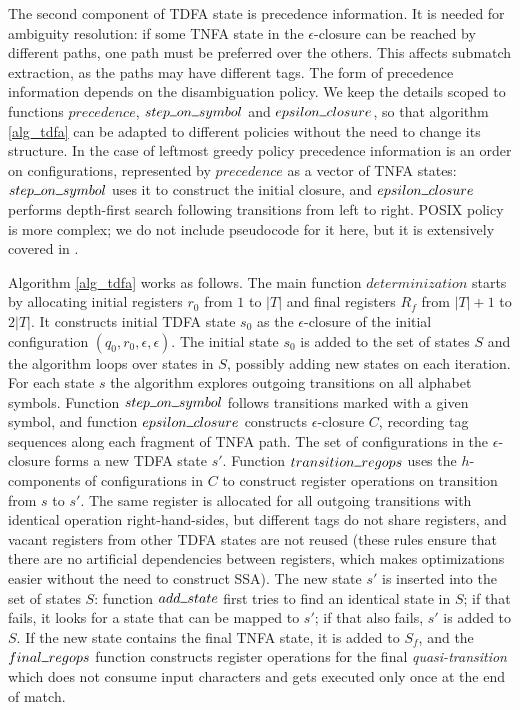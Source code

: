 \documentclass[]{article}
\newcommand{\Xund}{\rule{.5em}{.5pt}}
\begin{document}
The second component of TDFA state is precedence information.
It is needed for ambiguity resolution:
if some TNFA state in the $\epsilon$-closure can be reached by different paths, one path must be preferred over the others.
This affects submatch extraction, as the paths may have different tags.
The form of precedence information depends on the disambiguation policy.
We keep the details scoped to functions $precedence$, $step \Xund on \Xund symbol$ and $epsilon \Xund closure$,
so that algorithm \ref{alg_tdfa} can be adapted to different policies without the need to change its structure.
%
In the case of leftmost greedy policy precedence information is an order on configurations,
represented by $precedence$ as a vector of TNFA states:
$step \Xund on \Xund symbol$ uses it to construct the initial closure,
and $epsilon \Xund closure$ performs depth-first search following transitions from left to right.
%
POSIX policy is more complex; we do not include pseudocode for it here, but it is extensively covered in \cite{BorTro19}.
\medskip

Algorithm \ref{alg_tdfa} works as follows.
The main function $determinization$ starts by allocating initial registers $r_0$ from $1$ to $|T|$ and final registers $R_f$ from $|T| + 1$ to $2|T|$.
It constructs initial TDFA state $s_0$ as the $\epsilon$-closure of the initial configuration $(q_0, r_0, \epsilon, \epsilon)$.
The initial state $s_0$ is added to the set of states $S$ and the algorithm loops over states in $S$, possibly adding new states on each iteration.
For each state $s$ the algorithm explores outgoing transitions on all alphabet symbols.
Function $step \Xund on \Xund symbol$ follows transitions marked with a given symbol,
and  function $epsilon \Xund closure$ constructs $\epsilon$-closure $C$, recording tag sequences along each fragment of TNFA path.
%
The set of configurations in the $\epsilon$-closure forms a new TDFA state $s'$.
Function $transition \Xund regops$ uses the $h$-components of configurations in $C$ to construct register operations on transition from $s$ to $s'$.
%
The same register is allocated for all outgoing transitions with identical operation right-hand-sides,
but different tags do not share registers,
and vacant registers from other TDFA states are not reused
(these rules ensure that there are no artificial dependencies between registers, which makes optimizations easier without the need to construct SSA).
%
The new state $s'$ is inserted into the set of states $S$:
function $add \Xund state$ first tries to find an identical state in $S$;
if that fails, it looks for a state that can be mapped to $s'$;
if that also fails, $s'$ is added to $S$.
%
If the new state contains the final TNFA state, it is added to $S_f$,
and the $final \Xund regops$ function constructs register operations for the final \emph{quasi-transition}
which does not consume input characters and gets executed only once at the end of match.
\medskip
\end{document}

